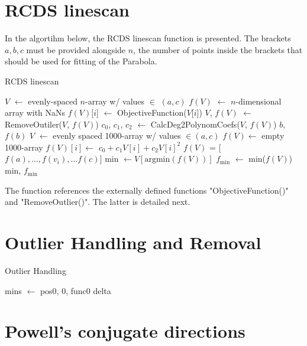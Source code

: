 \section{RCDS linescan}
In the algortihm below, the RCDS linescan function is presented. The brackets $a, b, c$ must be provided alongside $n$, the number of points inside the brackets that should be used for fitting of the Parabola.
\begin{algorithm}
    \caption{RCDS linescan}\label{alg:linescan}
    \begin{algorithmic}[1]
        \State $V$ $\gets$ evenly-spaced $n$-array w/ values $\in$ $(a, c)$
        \State $f(V)$ $\gets$ $n$-dimensional array with NaNs
            \State $f(V)$[$i$] $\gets$ ObjectiveFunction($V$[$i$])
        \EndFor
        \State $V$, $f(V)$ $\gets$ RemoveOutiler($V$, $f(V)$)
        \State $c_0$, $c_1$, $c_2$ $\gets$ CalcDeg2PolynomCoefs($V$, $f(V)$)
            \State \Return $b$, $f(b)$
        \EndIf
        \State $V$ $\gets$ evenly spaced 1000-array w/ values $\in(a,c)$
        \State $f(V)\gets$ empty 1000-array
            \State $f(V)[i] \gets$ $c_0+c_1V[i]+c_2V[i]^2$
        \EndFor
        \State $f(V)$ = [$f(a),\dots,f(v_i),\dots f(c)$]
        \State min $\gets V[\text{argmin}(f(V))]$
        \State $f_\text{min}$ $\gets$ min($f(V)$)
        \State \Return min, $f_\text{min}$
    \EndFunction
    \end{algorithmic}
    \end{algorithm}
The function references the externally defined functions "ObjectiveFunction()" and "RemoveOutlier()". The latter is detailed next.
\section{Outlier Handling and Removal}
\begin{algorithm}
    \caption{Outlier Handling}\label{alg:outlier}
    \begin{algorithmic}
        \State mins $\gets$ pos0, 0, func0
        \State delta
    \EndFunction
    \end{algorithmic}
    \end{algorithm}

\section{Powell's conjugate directions}
